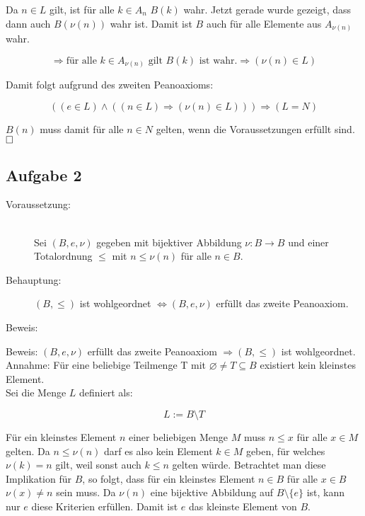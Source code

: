\documentclass[11pt, a4paper]{article}
\begin{document}
		Da $n \in L$ gilt, ist für alle $k \in A_n$ $B(k)$ wahr. Jetzt gerade wurde gezeigt, dass dann auch $B(\nu(n))$ wahr ist.
		Damit ist $B$ auch für alle Elemente aus $A_{\nu(n)}$ wahr.

		\[ \Rightarrow \text{für alle } k \in A_{\nu(n)} \text{ gilt } B(k) \text{ ist wahr.} \Rightarrow (\nu(n) \in L) \]

		Damit folgt aufgrund des zweiten Peanoaxioms:

		\[ ((e \in L) \wedge ((n \in L) \Rightarrow (\nu(n) \in L))) \Rightarrow (L=N) \]

		$B(n)$ muss damit für alle $n \in N$ gelten, wenn die Voraussetzungen erfüllt sind. $\hfill \Box$

		\newpage


	\subsection*{Aufgabe 2}

		\begin{description}
			\item[Voraussetzung:] \hfill \\
				Sei $(B,e,\nu)$ gegeben mit bijektiver Abbildung $\nu:B \longrightarrow B$ und einer Totalordnung $\leq$ mit $n \leq \nu(n)$ für alle $n \in B$. \hfill 

			\item[Behauptung:] \hfill 
				$(B,\leq)$ ist wohlgeordnet $\Leftrightarrow (B,e,\nu)$ erfüllt das zweite Peanoaxiom. \hfill \\

			\item[Beweis:] 
		\end{description}

		Beweis: $(B,e,\nu)$ erfüllt das zweite Peanoaxiom $\Rightarrow (B,\leq)$ ist wohlgeordnet.\\

		Annahme: Für eine beliebige Teilmenge T mit $\varnothing \neq T \subseteq B$ existiert kein kleinstes Element.\\

		Sei die Menge $L$ definiert als:

		\[ L := B \setminus T \]


		Für ein kleinstes Element $n$ einer beliebigen Menge $M$ muss $n \leq x$ für alle $x \in M$ gelten. Da $n \leq \nu(n)$ darf es also kein Element $k \in M$ geben, für welches $\nu(k) = n$ gilt, weil sonst auch $k \leq n$ gelten würde. Betrachtet man diese Implikation für $B$, so folgt, dass für ein kleinstes Element $n \in B$ für alle $x \in B$ $\nu(x) \neq n$ sein muss. Da $\nu(n)$ eine bijektive Abbildung auf $B\setminus \{e\}$ ist, kann nur $e$ diese Kriterien erfüllen. Damit ist $e$ das kleinste Element von $B$. \\
\end{document}
